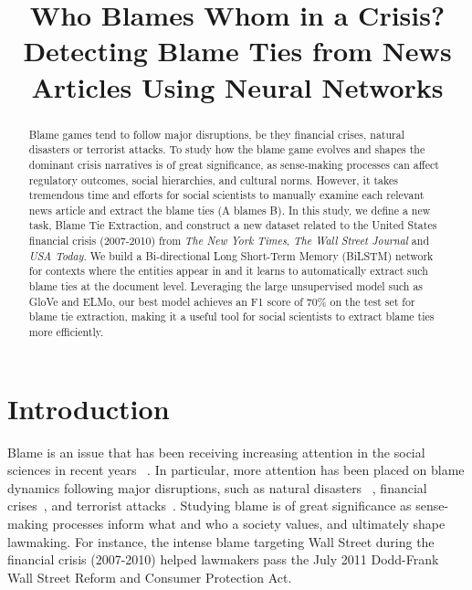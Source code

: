 \documentclass[letterpaper]{article} %
\begin{document}
\title{Who Blames Whom in a Crisis? Detecting Blame Ties from News Articles Using Neural Networks}
\maketitle
\begin{abstract}
Blame games tend to follow major disruptions, be they financial crises, natural disasters or terrorist attacks. To study how the blame game evolves and shapes the dominant crisis narratives is of great significance, as sense-making processes can affect regulatory outcomes, social hierarchies, and cultural norms. However, it takes tremendous time and efforts for social scientists to manually examine each relevant news article and extract the blame ties (A blames B). In this study, we define a new task, Blame Tie Extraction, and construct a new dataset related to the United States financial crisis (2007-2010) from {\it The New York Times}, {\it The Wall Street Journal} and {\it USA Today}. We build a Bi-directional Long Short-Term Memory (BiLSTM) network for contexts where the entities appear in and it learns to automatically extract such blame ties at the document level. Leveraging the large unsupervised model such as GloVe and ELMo, our best model achieves an F1 score of 70\% on the test set for blame tie extraction, making it a useful tool for social scientists to extract blame ties more efficiently.
\end{abstract}

\section{Introduction}

Blame is an issue that has been receiving increasing attention in the social sciences in recent years ~\cite{alicke2000culpable,mary1992risk,farmer2006aids,gephart1993textual,hobolt2014blaming,hood2010blame,shaver2012attribution,tilly2009credit}. In particular, more attention has been placed on blame dynamics following major disruptions, such as natural disasters ~\cite{boin2010leadership,malhotra2008attributing}, financial crises~\cite{nicolno,tourish2012metaphors}, and terrorist attacks~\cite{olmeda2008reversal}. Studying blame is of great significance as sense-making processes inform what and who a society values, and ultimately shape lawmaking. For instance, the intense blame targeting Wall Street during the financial crisis (2007-2010) helped lawmakers pass the July 2011 Dodd-Frank Wall Street Reform and Consumer Protection Act.
\end{document}

